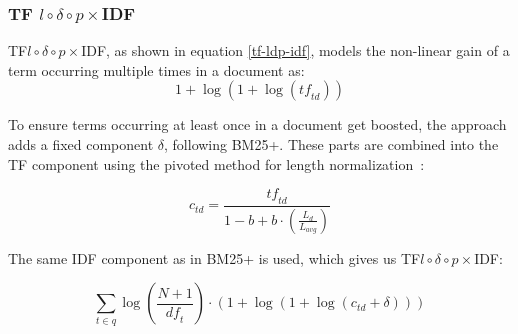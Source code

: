 \subsubsection{TF $l\circ\delta\circ p\times$IDF~\citep{tf-ldp-idf}}
TF$l\circ\delta\circ p\times$IDF, as shown in equation \ref{tf-ldp-idf}, models the non-linear gain of a term occurring multiple times in a document as:
\begin{equation}
	1+\log\left(1+\log\left(\mathit{tf}_{\mathit{td}}\right)\right) 
\end{equation}

To ensure terms occurring at least once in a document get boosted, the approach adds a fixed component $\delta$, following BM25+. These parts are combined into the TF component using the pivoted method for length normalization~\citep{ctd}:

\begin{equation}
	c_{\mathit{td}} = \frac{\mathit{tf}_{\mathit{td}}}{1-b+b\cdot\left(\frac{L_d}{L_{\mathit{avg}}}\right)}
\end{equation}

The same IDF component as in BM25+ is used, which gives us TF$l\circ\delta\circ p\times$IDF: 

\begin{equation}
	\label{tf-ldp-idf}
	\sum_{t\in q}\log\left(\frac{N+1}{\mathit{df}_t}\right)\cdot\left(1+\log\left(1+\log\left(c_{\mathit{td}}+\delta\right)\right)\right)
\end{equation}

